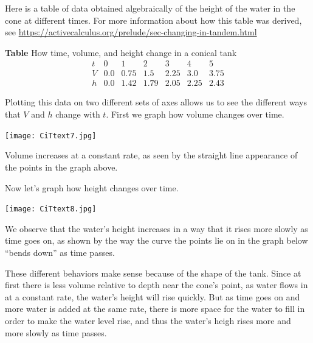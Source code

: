 \documentclass{ximera}
\begin{document}

Here is a table of data obtained algebraically of the height of the water in the cone at different times.  For more information about how this table was derived, see \url{https://activecalculus.org/prelude/sec-changing-in-tandem.html}

\begin{center}
\textbf{Table} How time, volume, and height change in a conical tank
$$
\begin{array}{lllllll}
t&0&1&2&3&4&5\\
\hline
V&0.0&0.75&1.5&2.25&3.0&3.75\\
\hline
h&0.0&1.42&1.79&2.05&2.25&2.43
\end{array}
$$
\end{center}


Plotting this data on two different sets of axes allows us to see the different ways that $V$ and $h$ change with $t$.  First we graph how volume changes over time.

\begin{image}
\texttt{[image: CiTtext7.jpg]}
\end{image}

Volume increases at a constant rate, as seen by the straight line appearance of the points in the graph above.  

Now let's graph how height changes over time.

\begin{image}
\texttt{[image: CiTtext8.jpg]}
\end{image}

We observe that the water's height increases in a way that it rises more slowly as time goes on, as shown by the way the curve the points lie on in the graph below ``bends down'' as time passes. 

These different behaviors make sense because of the shape of the tank.  Since at first there is less volume relative to depth near the cone's point, as water flows in at a constant rate, the water's height will rise quickly.  But as time goes on and more water is added at the same rate, there is more space for the water to fill in order to make the water level rise, and thus the water's heigh rises more and more slowly as time passes.%
\end{document}
